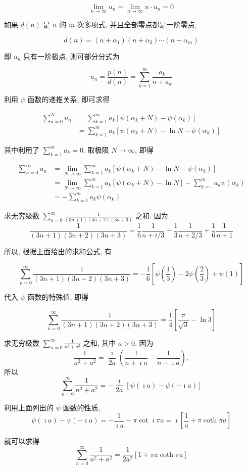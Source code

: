$$
\lim _{n \rightarrow \infty} u_{n}=\lim _{n \rightarrow \infty} n \cdot u_{n}=0
$$

如果 $d(n)$ 是 $n$ 的 $m$ 次多项式, 并且全部零点都是一阶零点,

$$
d(n)=\left(n+\alpha_{1}\right)\left(n+\alpha_{2}\right) \cdots\left(n+\alpha_{m}\right)
$$

即 $u_{n}$ 只有一阶极点, 则可部分分式为

$$
u_{n}=\frac{p(n)}{d(n)}=\sum_{k=1}^{m} \frac{a_{k}}{n+a_{k}}
$$

利用 $\psi$ 函数的递推关系, 即可求得

$$
\begin{aligned}
\sum_{n=0}^{N} u_{n} & =\sum_{k=1}^{m} a_{k}\left[\psi\left(\alpha_{k}+N\right)-\psi\left(\alpha_{k}\right)\right] \\
& =\sum_{k=1}^{m} a_{k}\left[\psi\left(\alpha_{k}+N\right)-\ln N-\psi\left(\alpha_{k}\right)\right]
\end{aligned}
$$

其中利用了 $\sum_{k=1}^{m} a_{k}=0$. 取极限 $N \rightarrow \infty$, 即得

$$
\begin{aligned}
\sum_{n=0}^{\infty} u_{n} & =\lim _{N \rightarrow \infty} \sum_{k=1}^{m} a_{k}\left[\psi\left(\alpha_{k}+N\right)-\ln N-\psi\left(\alpha_{k}\right)\right] \\
& =\lim _{N \rightarrow \infty} \sum_{k=1}^{m} a_{k}\left[\psi\left(\alpha_{k}+N\right)-\ln N\right]-\sum_{k=:}^{m} a_{k} \psi\left(\alpha_{k}\right) \\
& =-\sum_{k=1}^{m} a_{k} \psi\left(\alpha_{k}\right)
\end{aligned}
$$

\begin{examplebox}{求无穷级数 $\sum_{n=0}^{\infty} \frac{1}{(3 n+1)(3 n+2)(3 n+3)}$ 之和.}
因为
$$
\frac{1}{(3 n+1)(3 n+2)(3 n+3)}=\frac{1}{6} \frac{1}{n+i / 3}-\frac{1}{3} \frac{1}{n+2 / 3}+\frac{1}{6} \frac{1}{n+1}
$$

所以, 根据上面给出的求和公式, 有

$$
\sum_{n=0}^{\infty} \frac{1}{(3 n+1)(3 n+2)(3 n+3)}=-\frac{1}{6}\left[\psi\left(\frac{1}{3}\right)-2 \psi\left(\frac{2}{3}\right)+\psi(1)\right]
$$

代入 $\psi$ 函数的特殊值, 即得

$$
\sum_{n=0}^{\infty} \frac{1}{(3 n+1)(3 n+2)(3 n+3)}=\frac{1}{4}\left[\frac{\pi}{\sqrt{3}}-\ln 3\right]
$$
\end{examplebox}

\begin{examplebox}{求无穷级数 $\sum_{n=0}^{\infty} \frac{1}{n^{2}+a^{2}}$ 之和, 其中 $a>0$.}
因为
$$
\frac{1}{n^{2}+a^{2}}=\frac{\imath}{2 a}\left(\frac{1}{n+\imath a}-\frac{1}{n-\imath a}\right),
$$
所以
$$
\sum_{n=0}^{\infty} \frac{1}{n^{2}+a^{2}}=-\frac{\imath}{2 a}[\psi(\imath a)-\psi(-\imath a)]
$$

利用上面列出的 $\psi$ 函数的性质,
$$
\psi(\imath a)-\psi(-\imath a)=-\frac{1}{\imath a}-\pi \cot \imath \pi a=\imath\left[\frac{1}{a}+\pi \operatorname{coth} \pi a\right]
$$

就可以求得
$$
\sum_{n=0}^{\infty} \frac{1}{n^{2}+a^{2}}=\frac{1}{2 a^{2}}[1+\pi a \operatorname{coth} \pi a]
$$
\end{examplebox}